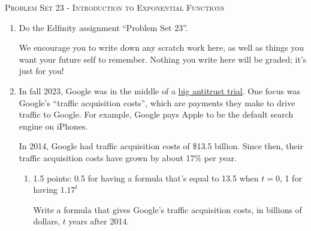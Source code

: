 \documentclass{article}
\makeatletter
\let\@href=\href
\renewcommand{\href}[2]{\@href{#1}{\ul{#2}}}
\newcommand{\doedfinity}[2][\newpage]{
  \begin{problem}[#1]
    Do the Edfinity assignment ``Problem Set #2''.

    We encourage you to write down any scratch work here, as well as
    things you want your future self to remember. Nothing you write
    here will be graded; it's just for you!
  \end{problem}
}
\makeatother
\begin{document}
\begin{center}
  \large\textsc{Problem Set 23 - Introduction to Exponential Functions}
\end{center}

\begin{enumerate}
\item  {}

  \doedfinity{23}  

\item \label{google-tac}

  In fall 2023, Google was in the middle of a \href{https://www.vox.com/technology/2023/9/11/23864514/google-search-antitrust-trial}{big antitrust trial}. One focus was Google's ``traffic acquisition costs'', which are payments they make to drive traffic to Google. For example, Google pays Apple to be the default search engine on iPhones.

  In 2014, Google had traffic acquisition costs of \$13.5 billion. Since then, their traffic acquisition costs have grown by about 17\% per year.

  \begin{enumerate}
  \item

    \begin{grading}
      1.5 points: 0.5 for having a formula that's equal to 13.5 when $t = 0$, 1 for having $1.17^t$
    \end{grading}

    \begin{problem}[\vfill]
      Write a formula that gives Google's traffic acquisition costs, in billions of dollars, $t$ years after 2014. 
    \end{problem}


\end{enumerate}
\end{enumerate}
\end{document}
